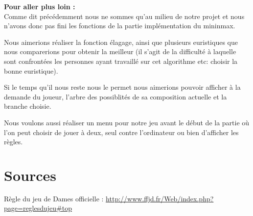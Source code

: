 \documentclass[12,french]{report}
\begin{document}
\textbf{Pour aller plus loin :} \\

Comme dit précédemment nous ne sommes qu'au milieu de notre projet
et nous n'avons donc pas fini les fonctions de la partie implémentation
du mininmax.

Nous aimerions réaliser la fonction élagage, ainsi que plusieurs euristiques
que nous comparerions pour obtenir la meilleur (il s'agit de la difficulté
à laquelle sont confrontées les personnes ayant travaillé sur cet
algorithme etc: choisir la bonne euristique).

Si le temps qu'il nous reste nous le permet nous aimerions pouvoir
afficher à la demande du joueur, l'arbre des possiblités de sa composition
actuelle et la branche choisie. 

Nous voulons aussi réaliser un menu pour notre jeu avant le début
de la partie où l'on peut choisir de jouer à deux, seul contre l'ordinateur
ou bien d'afficher les règles.

\listofalgorithms
\listoffigures

\chapter*{Sources}

Règle du jeu de Dames officielle : \url{http://www.ffjd.fr/Web/index.php?page=reglesdujeu#top}
\end{document}
